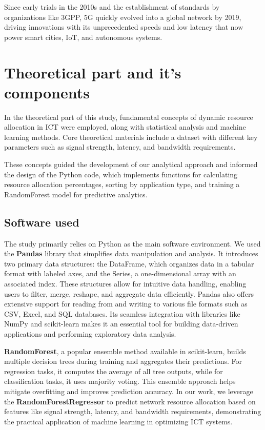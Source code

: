\documentclass[a4paper, 10pt, twocolumn]{article}
\begin{document}
Since early trials in the 2010s and the establishment of standards by organizations like 3GPP, 5G quickly evolved into a global network by 2019, driving innovations with its unprecedented speeds and low latency that now power smart cities, IoT, and autonomous systems.









\section{Theoretical part and it’s components}

In the theoretical part of this study, fundamental concepts of dynamic resource allocation in ICT were employed, along with statistical analysis and machine learning methods. Core theoretical materials include a dataset with different key parameters such as signal strength, latency, and bandwidth requirements. 

These concepts guided the development of our analytical approach and informed the design of the Python code, which implements functions for calculating resource allocation percentages, sorting by application type, and training a RandomForest model for predictive analytics.


\subsection{Software used}
The study primarily relies on Python as the main software environment. We used the \textbf{Pandas} \cite{KaggleLearn} library that simplifies data manipulation and analysis. It introduces two primary data structures: the DataFrame, which organizes data in a tabular format with labeled axes, and the Series, a one-dimensional array with an associated index. These structures allow for intuitive data handling, enabling users to filter, merge, reshape, and aggregate data efficiently. Pandas also offers extensive support for reading from and writing to various file formats such as CSV, Excel, and SQL databases. Its seamless integration with libraries like NumPy and scikit-learn makes it an essential tool for building data-driven applications and performing exploratory data analysis.

\textbf{RandomForest}, a popular ensemble method available in scikit-learn, builds multiple decision trees during training and aggregates their predictions. For regression tasks, it computes the average of all tree outputs, while for classification tasks, it uses majority voting. This ensemble approach helps mitigate overfitting and improves prediction accuracy. In our work, we leverage the \textbf{RandomForestRegressor} to predict network resource allocation based on features like signal strength, latency, and bandwidth requirements, demonstrating the practical application of machine learning in optimizing ICT systems.
\end{document}
